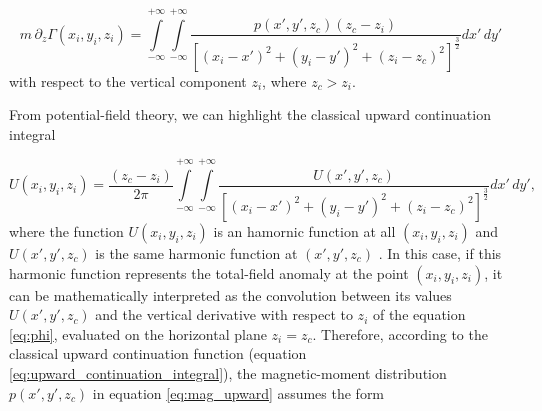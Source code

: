 \begin{equation}
m \, \partial_{z} \Gamma(x_i,y_i,z_i) = \int \limits_{-\infty}^{+\infty } \int \limits_{-\infty}^{+\infty }  \dfrac{p(x',y',z_c) (z_c - z_i)}{[(x_i-x')^2 + (y_i-y')^2 + (z_i-z_c)^2]^{\frac{3}{2}}}    dx' \,dy'
\label{eq:mag_upward}
\end{equation}
with respect to the vertical component $z_i$, where $z_c > z_i$. 

From potential-field theory, we can highlight the classical upward continuation integral 

\begin{equation}
U(x_i,y_i,z_i) = \dfrac{(z_c-z_i)}{2\pi} \int \limits_{-\infty}^{+\infty } \int \limits_{-\infty}^{+\infty }  \dfrac{U(x',y',z_c) }{[(x_i-x')^2 + (y_i-y')^2 + (z_i-z_c)^2]^{\frac{3}{2}}}    dx' \,dy',
\label{eq:upward_continuation_integral}
\end{equation}
where the function $U(x_i,y_i,z_i)$ is an hamornic function at all $(x_i,y_i,z_i)$ and  $U(x',y',z_c)$ is the same harmonic function at $(x',y',z_c)$ \citep{blakely1996}. In this case, if this harmonic function represents the total-field anomaly at the point $(x_i,y_i,z_i)$, it can be mathematically interpreted as the convolution between its values $U(x',y',z_c)$ and the vertical derivative with respect to $z_i$ of the equation \ref{eq:phi}, evaluated on the horizontal plane $z_i =z_c$. Therefore, according to the classical upward continuation function (equation \ref{eq:upward_continuation_integral}), the magnetic-moment distribution $p(x',y',z_c)$ in equation \ref{eq:mag_upward} assumes the form 

